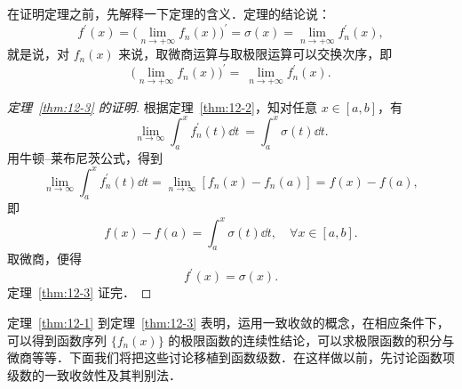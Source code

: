 在证明定理之前，先解释一下定理的含义．定理的结论说：
\[
f^{\prime}(x)=\big(\lim_{n\to+\infty}f_{n}(x)\big)^{\prime}=\sigma(x)=\lim_{n\to+\infty}f_{n}^{\prime}(x),
\]
就是说，对 $f_{n}(x)$ 来说，取微商运算与取极限运算可以交换次序，即
\[
\big(\lim_{n\to+\infty}f_{n}(x)\big)^{\prime}=\ \lim_{n\to+\infty}f_{n}^{\prime}(x).
\]

\begin{proof}[定理~\ref{thm:12-3} 的证明]
根据定理~\ref{thm:12-2}，知对任意 $x\in[a,b]$，有
\[
\lim_{n\to\infty}\int_{a}^{x}f_{n}^{\prime}(t)\dd t\ =\int_{a}^{x}\sigma(t)\dd t.
\]
用牛顿--莱布尼茨公式，得到
\[
\lim_{n\to\infty}\int_{a}^{x}f_{n}^{\prime}(t)\dd t=\lim_{n\to\infty}\left[f_{n}(x)-f_{n}(a)\right]=f(x)-f(a),
\]
即
\[
f(x)-f(a)=\int_{a}^{x}\sigma(t)\dd t,\quad\forall x\in[a,b].
\]
取微商，便得
\[
f^{\prime}(x)=\sigma(x).
\]
定理~\ref{thm:12-3} 证完．
\end{proof}

定理~\ref{thm:12-1} 到定理~\ref{thm:12-3} 表明，运用一致收敛的概念，在相应条件下，可以得到函数序列 $\{f_{n}(x)\}$ 的极限函数的连续性结论，可以求极限函数的积分与微商等等．下面我们将把这些讨论移植到函数级数．在这样做以前，先讨论函数项级数的一致收敛性及其判别法．

